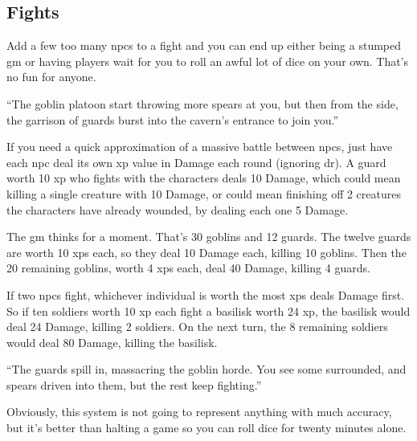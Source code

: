 \begin{multicols}{2}
\subsection{ Fights}
\label{npcfights}

Add a few too many \glspl{npc} to a fight and you can end up either being a stumped \gls{gm} or having players wait for you to roll an awful lot of dice on your own.
That's no fun for anyone.

\begin{exampletext}

	``The goblin platoon start throwing more spears at you, but then from the side, the garrison of guards burst into the cavern's entrance to join you.''

\end{exampletext}

If you need a quick approximation of a massive battle between \glspl{npc}, just have each \gls{npc} deal its own \gls{xp} value in Damage each round (ignoring \gls{dr}).
A guard worth 10 \gls{xp} who fights with the characters deals 10 Damage, which could mean killing a single creature with 10 Damage, or could mean finishing off 2 creatures the characters have already wounded, by dealing each one 5 Damage.

\begin{exampletext}

	The \gls{gm} thinks for a moment.
	That's 30 goblins and 12 guards.
	The twelve guards are worth 10 \glspl{xp} each, so they deal 10 Damage each, killing 10 goblins.
	Then the 20 remaining goblins, worth 4 \glspl{xp} each, deal 40 Damage, killing 4 guards.

\end{exampletext}

If two \glspl{npc} fight, whichever individual is worth the most \glspl{xp} deals Damage first.
So if ten soldiers worth 10 \gls{xp} each fight a basilisk worth 24 \gls{xp}, the basilisk would deal 24 Damage, killing 2 soldiers.
On the next turn, the 8 remaining soldiers would deal 80 Damage, killing the basilisk.

\begin{exampletext}

	``The guards spill in, massacring the goblin horde.
	You see some surrounded, and spears driven into them, but the rest keep fighting.''

\end{exampletext}

Obviously, this system is not going to represent anything with much accuracy, but it's better than halting a game so you can roll dice for twenty minutes alone.


\end{multicols}
